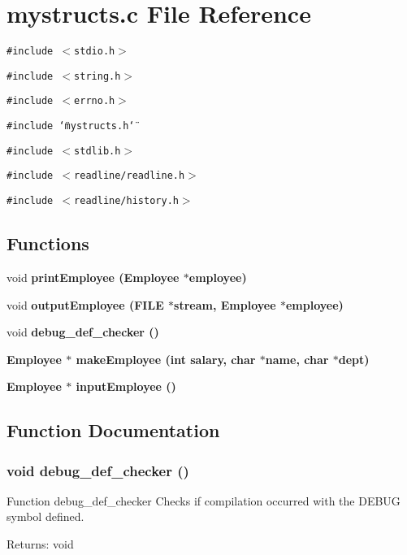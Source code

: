 \section{mystructs.c File Reference}
\label{mystructs_8c}
{\tt \#include $<$stdio.h$>$}\par
{\tt \#include $<$string.h$>$}\par
{\tt \#include $<$errno.h$>$}\par
{\tt \#include \char`\"{}mystructs.h\char`\"{}}\par
{\tt \#include $<$stdlib.h$>$}\par
{\tt \#include $<$readline/readline.h$>$}\par
{\tt \#include $<$readline/history.h$>$}\par
\subsection*{Functions}
\begin{CompactItemize}
\item 
void \bf{print\-Employee} (\bf{Employee} $\ast$employee)
\item 
void \bf{output\-Employee} (FILE $\ast$stream, \bf{Employee} $\ast$employee)
\item 
void \bf{debug\_\-def\_\-checker} ()
\item 
\bf{Employee} $\ast$ \bf{make\-Employee} (int salary, char $\ast$name, char $\ast$dept)
\item 
\bf{Employee} $\ast$ \bf{input\-Employee} ()
\end{CompactItemize}


\subsection{Function Documentation}
\subsubsection{\setlength{\rightskip}{0pt plus 5cm}void debug\_\-def\_\-checker ()}\label{mystructs_8c_5b44943f1d428a1652c893f0d0f25368}


Function debug\_\-def\_\-checker Checks if compilation occurred with the DEBUG symbol defined. \begin{Desc}
\item[Returns:]void \end{Desc}
